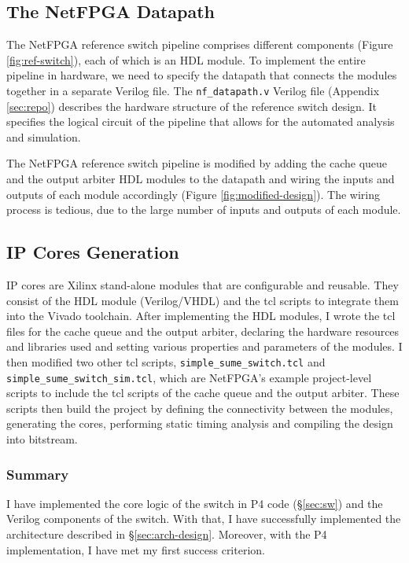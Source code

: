 	\subsection{The NetFPGA Datapath}
The NetFPGA reference switch pipeline comprises different components (Figure \ref{fig:ref-switch}), each of which is an HDL module. To implement the entire pipeline in hardware, we need to specify the datapath that connects the modules together in a separate Verilog file. The \verb|nf_datapath.v| Verilog file (Appendix \ref{sec:repo}) describes the hardware structure of the reference switch design. It specifies the logical circuit of the pipeline that allows for the automated analysis and simulation. 

The NetFPGA reference switch pipeline is modified by adding the cache queue and the output arbiter HDL modules to the datapath and wiring the inputs and outputs of each module accordingly (Figure \ref{fig:modified-design}). The wiring process is tedious, due to the large number of inputs and outputs of each module. 
	
	\subsection{IP Cores Generation}
IP cores are Xilinx stand-alone modules that are configurable and reusable. They consist of the HDL module (Verilog/VHDL) and the tcl scripts to integrate them into the Vivado toolchain. After implementing the HDL modules, I wrote the tcl files for the cache queue and the output arbiter, declaring the hardware resources and libraries used and setting various properties and parameters of the modules. I then modified two other tcl scripts, \verb|simple_sume_switch.tcl| and \verb|simple_sume_switch_sim.tcl|,  which are NetFPGA's example project-level scripts to include the tcl scripts of the cache queue and the output arbiter. These scripts then build the project by defining the connectivity between the modules, generating the cores, performing static timing analysis and compiling the design into bitstream.

\subsubsection{Summary}
I have implemented the core logic of the switch in P4 code (\S\ref{sec:sw}) and the Verilog components of the switch. With that, I have successfully implemented the architecture described in \S\ref{sec:arch-design}. Moreover, with the P4 implementation, I have met my first success criterion.